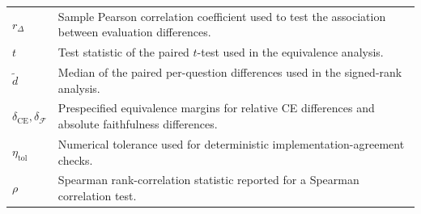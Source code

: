 \begin{longtable}{@{}>{\raggedright\arraybackslash}p{} p{}@{}}
	$r_{\Delta}$                                       & Sample Pearson correlation coefficient used to test the association between evaluation differences.                                                                                                                \\
	$t$                                                & Test statistic of the paired $t$-test used in the equivalence analysis.                                                                                                                                            \\
	$\widetilde{d}$                                    & Median of the paired per-question differences used in the signed-rank analysis.                                                                                                                                    \\
	$\delta_{\mathrm{CE}},\delta_{\mathcal{F}}$        & Prespecified equivalence margins for relative CE differences and absolute faithfulness differences.                                                                                                                \\
	$\eta_{\mathrm{tol}}$                              & Numerical tolerance used for deterministic implementation-agreement checks.                                                                                                                                        \\
	$\rho$                                             & Spearman rank-correlation statistic reported for a Spearman correlation test.                                                                                                                                      \\
\end{longtable}

